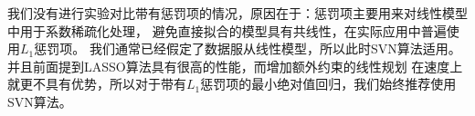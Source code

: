 我们没有进行实验对比带有惩罚项的情况，原因在于：惩罚项主要用来对线性模型中用于系数稀疏化处理，
避免直接拟合的模型具有共线性，在实际应用中普遍使用$L_1$惩罚项。
我们通常已经假定了数据服从线性模型，所以此时SVN算法适用。并且前面提到LASSO算法具有很高的性能，而增加额外约束的线性规划
在速度上就更不具有优势，所以对于带有$L_1$惩罚项的最小绝对值回归，我们始终推荐使用SVN算法。







